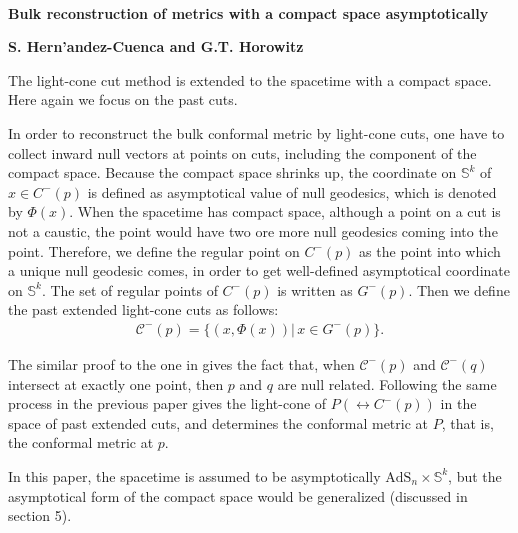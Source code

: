 \documentclass[12pt]{article}
\date{}
\begin{document}
{\Large{}\\[2mm]
\textbf{Bulk reconstruction of metrics with a compact space asymptotically \cite{Hernandez-Cuenca:2020ppu}
}
}

\noindent
\hfill
\textbf{S. Hern'andez-Cuenca and G.T. Horowitz}%

\vspace{12pt}
The light-cone cut method \cite{Engelhardt:2016wgb,Engelhardt:2016crc} is extended to the spacetime with a compact space.
Here again we focus on the past cuts.

In order to reconstruct the bulk conformal metric by light-cone cuts, one have to collect inward null vectors at points on cuts, including the component of the compact space.
Because the compact space shrinks up, the coordinate on $\mathbb S^k$ of $x \in C^-(p)$ is defined as asymptotical value of null geodesics, which is denoted by $\Phi(x)$.
When the spacetime has compact space, although a point on a cut is not a caustic, the point would have two ore more null geodesics coming into the point.
Therefore, we define the regular point on $C^-(p)$ as the point into which a unique null geodesic comes, in order to get well-defined asymptotical coordinate on $\mathbb S^k$.
The set of regular points of $C^-(p)$ is written as $G^-(p)$.
Then we define the past extended light-cone cuts as follows:
\begin{align}
	\mathcal C^-(p) = \{(x,\Phi(x))|\,x\in G^-(p)\}.
\end{align}

The similar proof to the one in \cite{Engelhardt:2016wgb} gives the fact that, when $\mathcal C^-(p)$ and $\mathcal C^-(q)$ intersect at exactly one point, then $p$ and $q$ are null related.
Following the same process in the previous paper gives the light-cone of $P (\leftrightarrow C^-(p))$ in the space of past extended cuts, and determines the conformal metric at $P$, that is, the conformal metric at $p$.

In this paper, the spacetime is assumed to be asymptotically $\mathrm{AdS}_n\times\mathbb S^k$, but  the asymptotical form of the compact space would be generalized (discussed in section 5).



 

\end{document}
